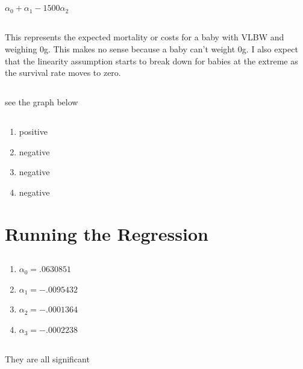 \documentclass[11pt]{article}
\begin{document}
\subsection{}
$\alpha_0 + \alpha_1-1500\alpha_2$

\subsection{}
This represents the expected mortality or costs for a baby with VLBW  and weighing 0g. This makes no sense because a baby can't weight 0g. I also expect that the linearity assumption starts to break down for babies at the extreme as the survival rate moves to zero. 

\subsection{} 
see the graph below 
\newpage\subsection{}

  \renewcommand{\theenumi}{\roman{enumi}}
\begin{enumerate}
	\item positive 
	\item negative 
	\item negative 
	\item negative 
\end{enumerate}

\section{Running the Regression}
\subsection{}
\begin{enumerate}
	\item $\alpha_0 = .0630851$
	\item $\alpha_1 = -.0095432 $
	\item $\alpha_2 = -.0001364 $
	\item  $\alpha_3 = -.0002238  $
\end{enumerate}

\subsection{}
They are all significant 
\end{document}
